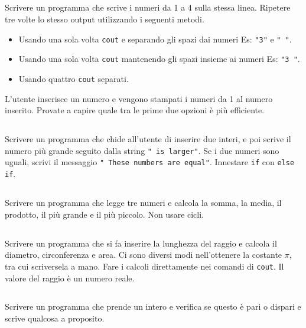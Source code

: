 \documentclass{article}
\begin{document}
\subsection{}
Scrivere un programma che scrive i numeri da 1 a 4 sulla stessa linea. Ripetere tre volte lo stesso output utilizzando i seguenti metodi.
\begin{itemize}
	\item Usando una sola volta \texttt{cout} e separando gli spazi dai numeri Es: \texttt{"3"} e \texttt{" "}.
	\item Usando una sola volta \texttt{cout} mantenendo gli spazi insieme ai numeri Es: \texttt{"3 "}.
	\item Usando quattro \texttt{cout} separati.
\end{itemize}

\begin{warn}[Estensione:]
	L'utente inserisce un numero e vengono stampati i numeri da 1 al numero inserito. Provate a capire quale tra le prime due opzioni è più efficiente.
\end{warn}

\subsection{}
Scrivere un programma che chide all'utente di inserire due interi, e poi scrive il numero più grande seguito dalla string \texttt{" is larger"}. Se i due numeri sono uguali, scrivi il messaggio \texttt{" These numbers are equal"}. Innestare \texttt{if} con \texttt{else if}.

\subsection{}
Scrivere un programma che legge tre numeri e calcola la somma, la media, il prodotto, il più grande e il più piccolo. Non usare cicli.

\subsection{}
Scrivere un programma che si fa inserire la lunghezza del raggio e calcola il diametro, circonferenza e area. Ci sono diversi modi nell'ottenere la costante $\pi$, tra cui scriversela a mano. Fare i calcoli direttamente nei comandi di \texttt{cout}. Il valore del raggio è un numero reale.

\subsection{}
Scrivere un programma che prende un intero e verifica se questo è pari o dispari e scrive qualcosa a proposito.
\end{document}
